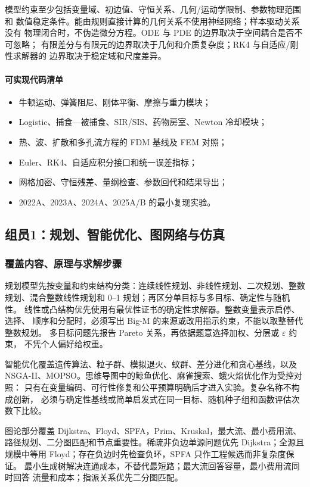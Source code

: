\documentclass[UTF8,a4paper,12pt]{ctexart}
\begin{document}
模型约束至少包括变量域、初边值、守恒关系、几何/运动学限制、参数物理范围和
数值稳定条件。能由规则直接计算的几何关系不使用神经网络；样本驱动关系没有
物理闭合时，不伪造微分方程。ODE 与 PDE 的边界取决于空间耦合是否不可忽略；
有限差分与有限元的边界取决于几何和介质复杂度；RK4 与自适应/刚性求解器的
边界取决于稳定域和尺度差异。

\paragraph{可实现代码清单}
\begin{itemize}
  \item 牛顿运动、弹簧阻尼、刚体平衡、摩擦与重力模块；
  \item Logistic、捕食—被捕食、SIR/SIS、药物房室、Newton 冷却模块；
  \item 热、波、扩散和多孔流方程的 FDM 基线及 FEM 对照；
  \item Euler、RK4、自适应积分接口和统一误差指标；
  \item 网格加密、守恒残差、量纲检查、参数回代和结果导出；
  \item 2022A、2023A、2024A、2025A/B 的最小复现实验。
\end{itemize}

\subsection{组员1：规划、智能优化、图网络与仿真}

\subsubsection{覆盖内容、原理与求解步骤}

规划模型先按变量和约束结构分类：连续线性规划、非线性规划、二次规划、整数
规划、混合整数线性规划和 0--1 规划；再区分单目标与多目标、确定性与随机性。
线性或凸结构优先使用有最优性证书的确定性求解器。整数变量表示启停、选择、
顺序和分配时，必须写出 Big-M 的来源或改用指示约束，不能以取整替代整数规划。
多目标问题先报告 Pareto 关系，再依据题意选择加权、分层或 $\varepsilon$ 约束，
不凭个人偏好给权重。

智能优化覆盖遗传算法、粒子群、模拟退火、蚁群、差分进化和贪心基线，以及
NSGA-II、MOPSO。思维导图中的鲸鱼优化、麻雀搜索、蛾火焰优化作为受控对照：
只有在变量编码、可行性修复和公平预算明确后才进入实验。复杂名称不构成创新，
必须与确定性基线或简单启发式在同一目标、随机种子组和函数评估次数下比较。

图论部分覆盖 Dijkstra、Floyd、SPFA，Prim、Kruskal，最大流、最小费用流、
路径规划、二分图匹配和节点重要性。稀疏非负边单源问题优先 Dijkstra；全源且
规模中等用 Floyd；存在负边时先检查负环，SPFA 只作工程候选而非复杂度保证。
最小生成树解决连通成本，不替代最短路；最大流回答容量，最小费用流同时回答
流量和成本；指派关系优先二分图匹配。
\end{document}
